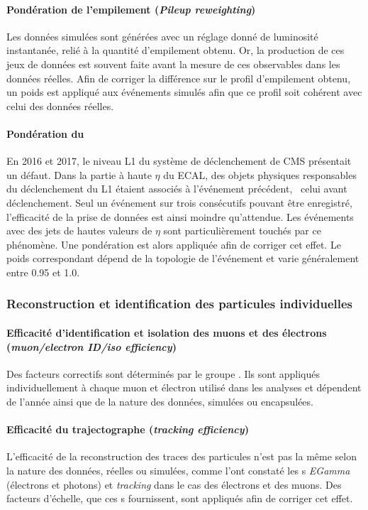 \paragraph{Pondération de l'empilement (\emph{Pileup reweighting})}
Les données simulées sont générées avec un réglage donné de luminosité instantanée, relié à la quantité d'empilement obtenu.
Or, la production de ces jeux de données est souvent faite avant la mesure de ces observables dans les données réelles.
Afin de corriger la différence sur le profil d'empilement obtenu, un poids est appliqué aux événements simulés afin que ce profil soit cohérent avec celui des données réelles.
\paragraph{Pondération du \prefiring}
En 2016 et 2017, le niveau L1 du système de déclenchement de CMS présentait un défaut.
Dans la partie à haute $\eta$ du ECAL, des objets physiques responsables du déclenchement du L1 étaient associés à l'événement précédent, \ie\ celui avant déclenchement.
Seul un événement sur trois consécutifs pouvant être enregistré, l'efficacité de la prise de données est ainsi moindre qu'attendue.
Les événements avec des jets de hautes valeurs de $\eta$ sont particulièrement touchés par ce phénomène.
Une pondération est alors appliquée afin de corriger cet effet.
Le poids correspondant dépend de la topologie de l'événement et varie généralement entre \num{0.95} et \num{1.0}.
\subsubsection{Reconstruction et identification des particules individuelles}
\paragraph{Efficacité d'identification et isolation des muons et des électrons (\emph{muon/electron ID/iso efficiency})}
Des facteurs correctifs sont déterminés par le groupe \Higgs\tau\tau.
Ils sont appliqués individuellement à chaque muon et électron utilisé dans les analyses et dépendent de l'année ainsi que de la nature des données, simulées ou encapsulées.
\paragraph{Efficacité du trajectographe (\emph{tracking efficiency})}
L'efficacité de la reconstruction des traces des particules n'est pas la même selon la nature des données, réelles ou simulées, comme l'ont constaté les \POG s \emph{EGamma} (électrons et photons) et \emph{tracking} dans le cas des électrons et des muons.
Des facteurs d'échelle, que ces \POG s fournissent, sont appliqués afin de corriger cet effet.
